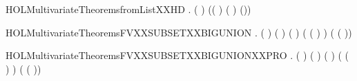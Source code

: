 \newcommand{\HOLMultivariateTheoremsfromListXXFAPPLYXXHD}{\UseVerbatim{HOLMultivariateTheoremsfromListXXFAPPLYXXHD}}
\begin{SaveVerbatim}{HOLMultivariateTheoremsfromListXXHD}
\HOLTokenTurnstile{} \HOLSymConst{\HOLTokenForall{}}   .
       \HOLSymConst{\HOLTokenNeg{}}   \HOLSymConst{\HOLTokenConj{}} (  \HOLSymConst{=}  ) \HOLSymConst{\HOLTokenImp{}}
       ((\HOLSymConst{::} \HOLSymConst{\HOLTokenMapto{}} \HOLSymConst{::}) \HOLSymConst{=} ( \HOLSymConst{\HOLTokenMapto{}} ) \HOLSymConst{|+} (\HOLSymConst{,}))
\end{SaveVerbatim}
\newcommand{\HOLMultivariateTheoremsfromListXXHD}{\UseVerbatim{HOLMultivariateTheoremsfromListXXHD}}
\begin{SaveVerbatim}{HOLMultivariateTheoremsFVXXSUBSETXXBIGUNION}
\HOLTokenTurnstile{} \HOLSymConst{\HOLTokenForall{}}  .
         \HOLSymConst{\HOLTokenConj{}} (  \HOLSymConst{=}  ) \HOLSymConst{\HOLTokenConj{}}
        ( ) ( ) \HOLSymConst{\HOLTokenImp{}}
        ( ( \HOLSymConst{\HOLTokenMapto{}} ) ) \HOLConst{\HOLTokenSubset{}}
         \HOLConst{\HOLTokenUnion{}}  (  ( ))
\end{SaveVerbatim}
\newcommand{\HOLMultivariateTheoremsFVXXSUBSETXXBIGUNION}{\UseVerbatim{HOLMultivariateTheoremsFVXXSUBSETXXBIGUNION}}
\begin{SaveVerbatim}{HOLMultivariateTheoremsFVXXSUBSETXXBIGUNIONXXPRO}
\HOLTokenTurnstile{} \HOLSymConst{\HOLTokenForall{}}  .
         \HOLSymConst{\HOLTokenConj{}} (  \HOLSymConst{=}  ) \HOLSymConst{\HOLTokenConj{}}
        ( ) ( ) \HOLSymConst{\HOLTokenImp{}}
        ( ( \HOLSymConst{\HOLTokenMapto{}} ) ) \HOLConst{\HOLTokenSubset{}}
            \HOLConst{\HOLTokenUnion{}}  (  ( ))
\end{SaveVerbatim}
